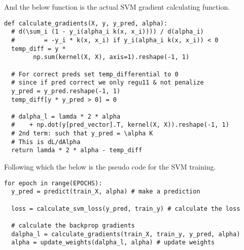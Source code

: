 \documentclass[hidelinks]{book}
\numberwithin{equation}{section}
\begin{document}
And the below function is the actual SVM gradient calculating function.
\begin{verbatim}
def calculate_gradients(X, y, y_pred, alpha):
  # d(\sum_i (1 - y_i(alpha_i k(x, x_i)))) / d(alpha_i)
  #        = -y_i * k(x, x_i) if y_i(alpha_i k(x, x_i)) < 0
  temp_diff = y *
        np.sum(kernel(X, X), axis=1).reshape(-1, 1)

  # For correct preds set temp_differential to 0
  # since if pred correct we only regu11 & not penalize
  y_pred = y_pred.reshape(-1, 1)
  temp_diff[y * y_pred > 0] = 0

  # dalpha_l = lamda * 2 * alpha
  #    + np.dot(y[pred_vector].T, kernel(X, X)).reshape(-1, 1)
  # 2nd term: such that y_pred = \alpha K
  # This is dL/dAlpha
  return lamda * 2 * alpha - temp_diff
\end{verbatim}

Following which the below is the pseudo code for the SVM training.
\begin{verbatim}
for epoch in range(EPOCHS):
  y_pred = predict(train_X, alpha) # make a prediction

  loss = calculate_svm_loss(y_pred, train_y) # calculate the loss

  # calculate the backprop gradients
  dalpha_l = calculate_gradients(train_X, train_y, y_pred, alpha)
  alpha = update_weights(dalpha_l, alpha) # update weights
\end{verbatim}
\end{document}
